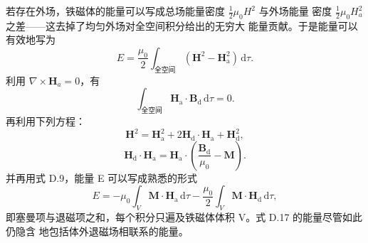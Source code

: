 若存在外场，铁磁体的能量可以写成总场能量密度 $\frac{1}{2}\mu_0H^{2}$ 与外场能量
密度 $\frac{1}{2}\mu_0H_a^{2}$ 之差——这去掉了均匀外场对全空间积分给出的无穷大
能量贡献。于是能量可以有效地写为
\begin{equation*}
E = \frac{\mu_0}{2}\int_{\text{全空间}}(\mathbf{H}^{2}-\mathbf{H}_{\mathrm{a}}^{2})\,\mathrm{d}\tau.\tag{D.13}
\end{equation*}
利用 $\nabla\times\mathbf{H}_a=0$，有
\begin{equation*}
\int_{\text{全空间}}\mathbf{H}_{\mathrm{a}}\cdot\mathbf{B}_{\mathrm{d}}\,\mathrm{d}\tau = 0.\tag{D.14}
\end{equation*}
再利用下列方程：
\begin{equation*}
\mathbf{H}^{2} = \mathbf{H}_{\mathrm{a}}^{2} + 2\mathbf{H}_{\mathrm{d}}\cdot\mathbf{H}_{\mathrm{a}} + \mathbf{H}_{\mathrm{d}}^{2},\tag{D.15}
\end{equation*}
\begin{equation*}
\mathbf{H}_{\mathrm{d}}\cdot\mathbf{H}_{\mathrm{a}} = \mathbf{H}_{\mathrm{a}}\cdot\left(\frac{\mathbf{B}_{\mathrm{d}}}{\mu_0}-\mathbf{M}\right).\tag{D.16}
\end{equation*}
并再用式 D.9，能量 E 可以写成熟悉的形式
\begin{equation*}
E = -\mu_0\int_V\mathbf{M}\cdot\mathbf{H}_{\mathrm{a}}\,\mathrm{d}\tau - \frac{\mu_0}{2}\int_V\mathbf{M}\cdot\mathbf{H}_{\mathrm{d}}\,\mathrm{d}\tau,\tag{D.17}
\end{equation*}
即塞曼项与退磁项之和，每个积分只遍及铁磁体体积 V。式 D.17 的能量尽管如此仍隐含
地包括体外退磁场相联系的能量。

